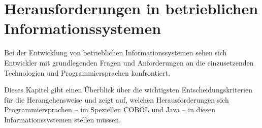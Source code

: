 \chapter{Herausforderungen in betrieblichen Informationssystemen}
Bei der Entwicklung von betrieblichen Informationssystemen sehen sich Entwickler mit grundlegenden Fragen und Anforderungen an die einzusetzenden Technologien und Programmiersprachen konfrontiert.

Dieses Kapitel gibt einen Überblick über die wichtigsten Entscheidungskriterien für die Herangehensweise und zeigt auf, welchen Herausforderungen sich Programmiersprachen -- im Speziellen COBOL und Java -- in diesen Informationssystemen stellen müssen.

    
    
    
    
    
    